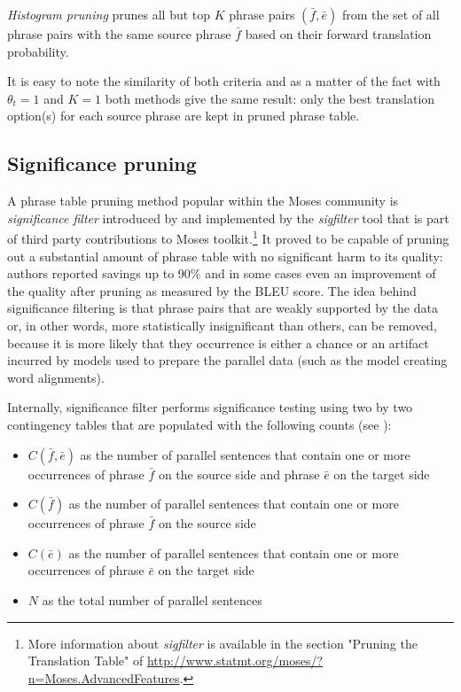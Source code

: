 \emph{Histogram pruning} prunes all but top $K$ phrase pairs $(\bar{f},\bar{e})$ from the set
of all phrase pairs with the same source phrase $\bar{f}$ based on their forward translation
probability.

It is easy to note the similarity of both criteria and as a matter of the fact with $\theta_{t} = 1$
and $K = 1$ both methods give the same result: only the best translation option(s) for each
source phrase are kept in pruned phrase table.

\subsection{Significance pruning}
\label{sec:significance-pruning}

A phrase table pruning method popular within the Moses community is \emph{significance filter}
introduced by \citet{johnson:sigfilter} and implemented by the \emph{sigfilter} tool
that is part of third party contributions to Moses toolkit.\footnote{More information
about \emph{sigfilter} is available in the section "Pruning the Translation Table" of
\url{http://www.statmt.org/moses/?n=Moses.AdvancedFeatures}.}
It proved to be capable of pruning out a substantial amount of phrase table with no
significant harm to its quality: authors reported savings up to 90\% and in some cases
even an improvement of the quality after pruning as measured by the BLEU score.
The idea behind significance filtering is that phrase pairs that are weakly supported
by the data or, in other words, more statistically insignificant than others, can be
removed, because it is more likely that they occurrence is either a chance or an artifact
incurred by models used to prepare the parallel data (such as the model creating word
alignments).

Internally, significance filter performs significance testing using two by two
contingency tables that are populated with the following counts (see
):
\begin{itemize}
  \item $C(\bar{f},\bar{e})$ as the number of parallel sentences that contain one or more
    occurrences of phrase $\bar{f}$ on the source side and phrase $\bar{e}$ on the target side
  \item $C(\bar{f})$ as the number of parallel sentences that contain one or more
    occurrences of phrase $\bar{f}$ on the source side
  \item $C(\bar{e})$ as the number of parallel sentences that contain one or more
    occurrences of phrase $\bar{e}$ on the target side
  \item $N$ as the total number of parallel sentences
\end{itemize}

